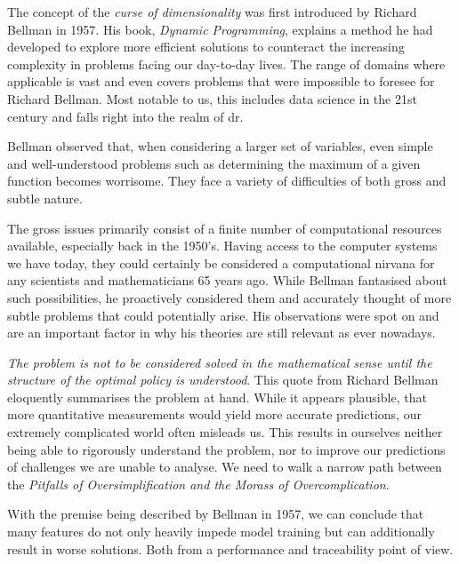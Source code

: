 The concept of the \emph{curse of dimensionality} was first introduced by Richard Bellman in 1957. \cite{DynProg}
His book, \emph{Dynamic Programming}, explains a method he had developed to explore more efficient solutions to counteract the increasing complexity in problems facing our day-to-day lives. 
The range of domains where applicable is vast and even covers problems that were impossible to foresee for Richard Bellman.
Most notable to us, this includes data science in the 21st century and falls right into the realm of \acrlong{dr}.

Bellman observed that, when considering a larger set of variables, even simple and well-understood problems such as determining the maximum of a given function becomes worrisome.
They face a variety of difficulties of both gross and subtle nature.

The gross issues primarily consist of a finite number of computational resources available, especially back in the 1950's. 
Having access to the computer systems we have today, they could certainly be considered a computational nirvana for any scientists and mathematicians 65 years ago.
While Bellman fantasised about such possibilities, he proactively considered them and accurately thought of more subtle problems that could potentially arise.
His observations were spot on and are an important factor in why his theories are still relevant as ever nowadays.

\emph{The problem is not to be considered solved in the mathematical sense until the structure of the optimal policy is understood}. \cite{DynProg}
This quote from Richard Bellman eloquently summarises the problem at hand.  
While it appears plausible, that more quantitative measurements would yield more accurate predictions, our extremely complicated world often misleads us.
This results in ourselves neither being able to rigorously understand the problem, nor to improve our predictions of challenges we are unable to analyse.
We need to walk a narrow path between the \emph{Pitfalls of Oversimplification and the Morass of Overcomplication}. \cite{DynProg}

With the premise being described by Bellman in 1957, we can conclude that many features do not only heavily impede model training but can additionally result in worse solutions. \cite{HandsOnMLCh8}
Both from a performance and traceability point of view.
